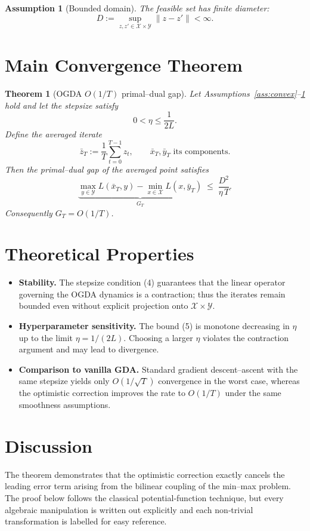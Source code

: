 \documentclass{article}
\newtheorem{theorem}{Theorem}
\newtheorem{assumption}{Assumption}
\begin{document}
\begin{assumption}[Bounded domain]\label{ass:bounded}
The feasible set has finite diameter:
\[
D:=\sup_{z,z'\in\mathcal{X}\times\mathcal{Y}}\|z-z'\| <\infty .
\tag{3}
\]
\end{assumption}

\section*{Main Convergence Theorem}
\begin{theorem}[OGDA $O(1/T)$ primal–dual gap]\label{thm:ogda}
Let Assumptions~\ref{ass:convex}--\ref{ass:bounded} hold and let the stepsize satisfy
\[
0<\eta\le\frac{1}{2L}.
\tag{4}
\]
Define the averaged iterate
\[
\bar z_{T}:=\frac{1}{T}\sum_{t=0}^{T-1}z_{t},\qquad
\bar x_{T},\bar y_{T}\text{ its components}.
\]
Then the primal–dual gap of the averaged point satisfies
\[
\underbrace{\max_{y\in\mathcal{Y}}L(\bar x_{T},y)-\min_{x\in\mathcal{X}}L(x,\bar y_{T})}_{\displaystyle G_{T}}
\;\le\;
\frac{D^{2}}{\eta\,T}.
\tag{5}
\]
Consequently $G_{T}=O(1/T)$.
\end{theorem}

\section*{Theoretical Properties}
\begin{itemize}
\item \textbf{Stability.} The stepsize condition (4) guarantees that the
linear operator governing the OGDA dynamics is a contraction; thus the iterates remain bounded even without explicit projection onto $\mathcal{X}\times\mathcal{Y}$.
\item \textbf{Hyperparameter sensitivity.} The bound (5) is monotone decreasing in $\eta$ up to the limit $\eta=1/(2L)$. Choosing a larger $\eta$ violates the contraction argument and may lead to divergence.
\item \textbf{Comparison to vanilla GDA.} Standard gradient descent–ascent with the same stepsize yields only $O(1/\sqrt{T})$ convergence in the worst case, whereas the optimistic correction improves the rate to $O(1/T)$ under the same smoothness assumptions.
\end{itemize}

\section*{Discussion}
The theorem demonstrates that the optimistic correction exactly cancels the leading error term arising from the bilinear coupling of the min–max problem. The proof below follows the classical potential‑function technique, but every algebraic manipulation is written out explicitly and each non‑trivial transformation is labelled for easy reference.
\end{document}
